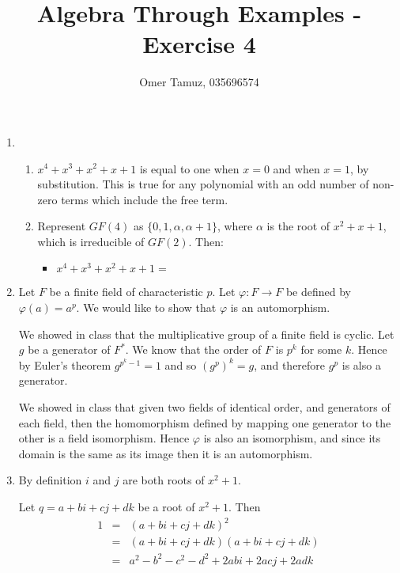 \documentclass[11pt]{article} \usepackage{amssymb}
\renewcommand{\phi}{\varphi}
\begin{document}
\title{Algebra Through Examples - Exercise 4}

 \author{Omer Tamuz, 035696574}
\maketitle


\begin{enumerate}
\item 
  \begin{enumerate}
  \item 

    $x^4+x^3+x^2+x+1$ is equal to one when $x=0$ and when $x=1$, by
    substitution. This is true for any polynomial with an odd number
    of non-zero terms which include the free term.
  \item

    Represent $GF(4)$ as $\{0,1,\alpha,\alpha+1\}$, where $\alpha$ is the
    root of $x^2+x+1$, which is irreducible of $GF(2)$. 
    Then:
    \begin{itemize}
    \item $x^4+x^3+x^2+x+1=$
    \end{itemize}

  \end{enumerate}
\item

  Let $F$ be a finite field of characteristic $p$. Let $\phi:F\to F$ be defined
  by $\phi(a)=a^p$. We would like to show that $\phi$ is an automorphism. 


  We showed in class that the multiplicative group of a 
  finite field is cyclic. Let $g$ be a generator of $F^*$.
  We know that the order of $F$ is $p^k$ for some $k$. 
  Hence by Euler's theorem $g^{p^k-1}=1$ and so $\left(g^p\right)^k=g$, and 
  therefore $g^p$ is also a generator. 

  We showed in class that given two fields of identical order, and generators
  of each field, then the homomorphism defined by mapping one generator to the
  other is a field isomorphism. Hence $\phi$ is also an isomorphism, and since
  its domain is the same as its image then it is an automorphism.

\item

  By definition $i$ and $j$ are both roots of $x^2+1$. 

  Let $q=a+bi+cj+dk$ be a root of $x^2+1$. Then
  \begin{eqnarray*}
    1 &=&(a+bi+cj+dk)^2
    \\ &=&(a+bi+cj+dk)(a+bi+cj+dk)
    \\ &=&a^2-b^2-c^2-d^2+2abi+2acj+2adk
  \end{eqnarray*}


\end{enumerate}
\end{document}
